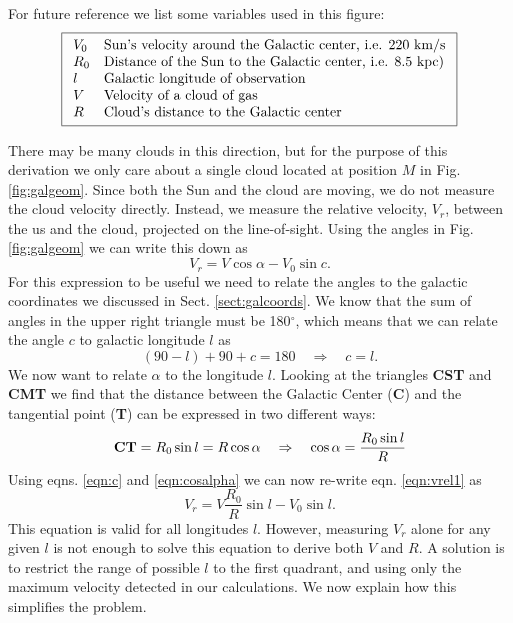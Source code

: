 For future reference we list some variables used in this figure:
\begin{displaymath}
	\boxed{
\begin{array}{ll}
	V_0 	&\hbox{Sun's velocity around the Galactic center, i.e. 220 km/s}					\\
    R_0	&\hbox{Distance of the Sun to the Galactic center, i.e. 8.5 kpc}) 					\\
l	&\hbox{Galactic longitude of observation}				\\
V	&\hbox{Velocity of a cloud of gas}			\\
R	&\hbox{Cloud's distance to the Galactic center}		\\
\end{array}
}
\end{displaymath}

There may be many clouds in this direction, but for the purpose of this
derivation we only care about a single cloud located at position $M$ in Fig.
\ref{fig:galgeom}. Since both the Sun and the cloud are moving, we do not measure
the cloud velocity directly. Instead, we measure the relative velocity, $V_r$,
between the us and the cloud, projected on the line-of-sight.  Using the angles
in Fig. \ref{fig:galgeom} we can write this down as 
\begin{equation}
V_r = V \cos\alpha - V_0 \sin c .
\label{eqn:vrel1}
\end{equation}
For this expression to be useful we need to relate the angles to the galactic
coordinates we discussed in Sect. \ref{sect:galcoords}.  We know that
the sum of angles in the upper right triangle must be 180$^\circ$, which means that 
we can relate the angle $c$ to galactic longitude $l$ as
\begin{equation}
(90-l)+90+c=180 \quad \Rightarrow \quad c=l.
\label{eqn:c}
\end{equation}
We now want to relate $\alpha$ to the longitude $l$. Looking at the
triangles {\bf CST} and {\bf CMT} we find that the distance between the
Galactic Center ({\bf C}) and the tangential point ({\bf T}) can be expressed
in two different ways: 
\begin{equation}
	{\rm\bf CT} = R_0\sin l = R \cos\alpha \quad \Rightarrow \quad \cos \alpha = \frac{R_0\sin l}{R}
\label{eqn:cosalpha}
\end{equation}
Using eqns. \ref{eqn:c} and \ref{eqn:cosalpha} we can now re-write eqn. \ref{eqn:vrel1} as
\begin{equation}
\boxed{V_r = V \frac{R_0}{R}\sin l - V_0 \sin l .}
\label{eqn:vrel2}
\end{equation}
This equation is valid for all longitudes $l$. However, measuring $V_r$ alone for any given $l$
is not enough to solve this equation to derive both $V$ and $R$. A solution is to restrict
the range of possible $l$ to the first quadrant, and using only the maximum velocity detected
in our calculations. We now explain how this simplifies the problem. 

